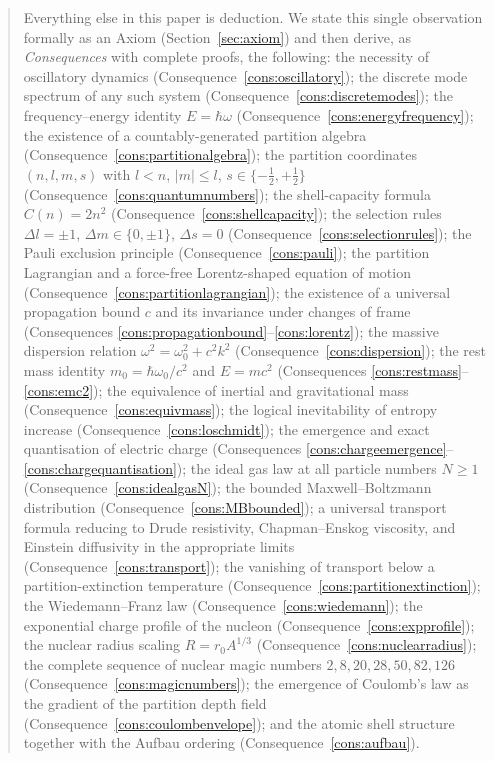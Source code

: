 \documentclass[11pt,twocolumn,a4paper]{article}
\theoremstyle{axiomstyle}
\theoremstyle{conseqstyle}
\theoremstyle{definition}
\theoremstyle{remark}
\begin{document}
\begin{abstract}
Everything else in this paper is deduction. We state this single observation formally as an Axiom (Section~\ref{sec:axiom}) and then derive, as \emph{Consequences} with complete proofs, the following: the necessity of oscillatory dynamics (Consequence~\ref{cons:oscillatory}); the discrete mode spectrum of any such system (Consequence~\ref{cons:discretemodes}); the frequency--energy identity $E=\hbar\omega$ (Consequence~\ref{cons:energyfrequency}); the existence of a countably-generated partition algebra (Consequence~\ref{cons:partitionalgebra}); the partition coordinates $(n,l,m,s)$ with $l<n$, $|m|\le l$, $s\in\{-\tfrac12,+\tfrac12\}$ (Consequence~\ref{cons:quantumnumbers}); the shell-capacity formula $C(n)=2n^{2}$ (Consequence~\ref{cons:shellcapacity}); the selection rules $\Delta l=\pm 1$, $\Delta m\in\{0,\pm1\}$, $\Delta s=0$ (Consequence~\ref{cons:selectionrules}); the Pauli exclusion principle (Consequence~\ref{cons:pauli}); the partition Lagrangian and a force-free Lorentz-shaped equation of motion (Consequence~\ref{cons:partitionlagrangian}); the existence of a universal propagation bound $c$ and its invariance under changes of frame (Consequences \ref{cons:propagationbound}--\ref{cons:lorentz}); the massive dispersion relation $\omega^{2}=\omega_{0}^{2}+c^{2}k^{2}$ (Consequence~\ref{cons:dispersion}); the rest mass identity $m_{0}=\hbar\omega_{0}/c^{2}$ and $E=mc^{2}$ (Consequences \ref{cons:restmass}--\ref{cons:emc2}); the equivalence of inertial and gravitational mass (Consequence~\ref{cons:equivmass}); the logical inevitability of entropy increase (Consequence~\ref{cons:loschmidt}); the emergence and exact quantisation of electric charge (Consequences \ref{cons:chargeemergence}--\ref{cons:chargequantisation}); the ideal gas law at all particle numbers $N\ge 1$ (Consequence~\ref{cons:idealgasN}); the bounded Maxwell--Boltzmann distribution (Consequence~\ref{cons:MBbounded}); a universal transport formula reducing to Drude resistivity, Chapman--Enskog viscosity, and Einstein diffusivity in the appropriate limits (Consequence~\ref{cons:transport}); the vanishing of transport below a partition-extinction temperature (Consequence~\ref{cons:partitionextinction}); the Wiedemann--Franz law (Consequence~\ref{cons:wiedemann}); the exponential charge profile of the nucleon (Consequence~\ref{cons:expprofile}); the nuclear radius scaling $R=r_{0}A^{1/3}$ (Consequence~\ref{cons:nuclearradius}); the complete sequence of nuclear magic numbers $2,8,20,28,50,82,126$ (Consequence~\ref{cons:magicnumbers}); the emergence of Coulomb's law as the gradient of the partition depth field (Consequence~\ref{cons:coulombenvelope}); and the atomic shell structure together with the Aufbau ordering (Consequence~\ref{cons:aufbau}).


\end{abstract}
\end{document}
